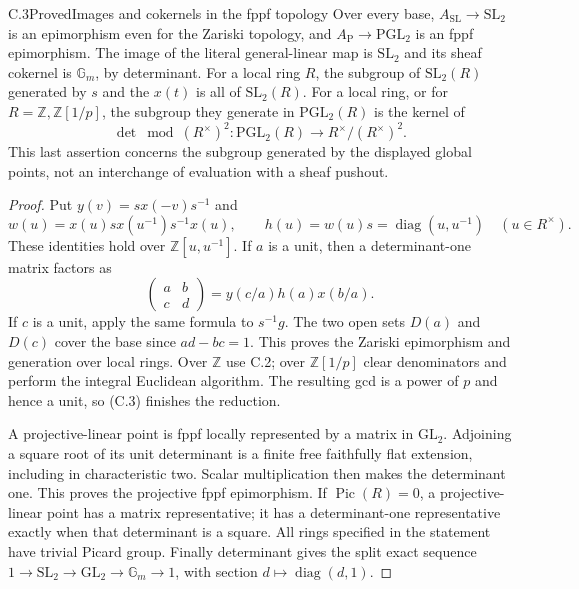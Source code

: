 \begin{statement}{C.3}{Proved}{Images and cokernels in the fppf topology}
Over every base, $A_{\mathrm{SL}}\to\mathrm{SL}_2$ is an epimorphism
even for the Zariski topology, and $A_{\mathrm P}\to\mathrm{PGL}_2$
is an fppf epimorphism. The image of the literal general-linear map is
$\mathrm{SL}_2$ and its sheaf cokernel is $\mathbb G_m$, by determinant.
For a local ring $R$, the subgroup of $\mathrm{SL}_2(R)$ generated by
$s$ and the $x(t)$ is all of $\mathrm{SL}_2(R)$. For a local ring, or
for $R=\mathbb Z,\mathbb Z[1/p]$, the subgroup they generate in
$\mathrm{PGL}_2(R)$ is the kernel of
\[
 \det\bmod (R^\times)^2:\mathrm{PGL}_2(R)\longrightarrow
 R^\times/(R^\times)^2.                                             \tag{C.2}
\]
This last assertion concerns the subgroup generated by the displayed
global points, not an interchange of evaluation with a sheaf pushout.
\end{statement}
\begin{proof}
Put $y(v)=s x(-v)s^{-1}$ and
\[
 w(u)=x(u)sx(u^{-1})s^{-1}x(u),\qquad h(u)=w(u)s
       =\operatorname{diag}(u,u^{-1})\quad(u\in R^\times).
\]
These identities hold over $\mathbb Z[u,u^{-1}]$. If $a$ is a unit,
then a determinant-one matrix factors as
\[
 \begin{pmatrix}a&b\\c&d\end{pmatrix}
 =y(c/a)h(a)x(b/a).                                                 \tag{C.3}
\]
If $c$ is a unit, apply the same formula to $s^{-1}g$.
The two open sets $D(a)$ and $D(c)$ cover the base since $ad-bc=1$.
This proves the Zariski epimorphism and generation over local rings.
Over $\mathbb Z$ use C.2; over $\mathbb Z[1/p]$ clear denominators
and perform the integral Euclidean algorithm. The resulting gcd is
a power of $p$ and hence a unit, so (C.3) finishes the reduction.

A projective-linear point is fppf locally represented by a matrix in
$\mathrm{GL}_2$. Adjoining a square root of its unit determinant is
a finite free faithfully flat extension, including in characteristic
two. Scalar multiplication then makes the determinant one. This proves
the projective fppf epimorphism. If $\operatorname{Pic}(R)=0$, a
projective-linear point has a matrix representative; it has a
determinant-one representative exactly when that determinant is a
square. All rings specified in the statement have trivial Picard group.
Finally determinant gives the split exact sequence
$1\to\mathrm{SL}_2\to\mathrm{GL}_2\to\mathbb G_m\to1$,
with section $d\mapsto\operatorname{diag}(d,1)$.
\end{proof}

